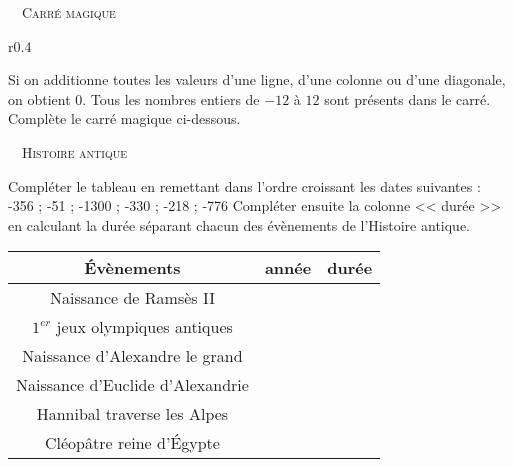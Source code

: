 \documentclass[../Cours.tex]{subfiles}
\begin{document}
\begin{questions}
    \exercice ~~\textsc{Carré magique}\\
    
    \begin{wrapfigure}{r}{0.4\linewidth}
    \vspace{-1cm}
    \end{wrapfigure}
    
    Si on additionne toutes les valeurs d'une ligne, d'une colonne ou d'une diagonale, on obtient 0. Tous les nombres entiers de $-12$ à $12$ sont présents dans le carré.\\
    Complète le carré magique ci-dessous.
    
    \vspace{2cm}
    \exercice ~~\textsc{Histoire antique}
    
    \question Compléter le tableau en remettant dans l'ordre croissant les dates suivantes : \\-356 ; -51 ; -1300 ; -330 ; -218 ; -776
    \question Compléter ensuite la colonne << durée >> en calculant la durée séparant chacun des évènements de l'Histoire antique.
    \begin{center}
    \begin{tabular}{|c|c|c|}\hline
    Évènements & année & durée \\\hline
    Naissance de Ramsès II  & & \\\hline
    $1^{er}$ jeux olympiques antiques  & & \\\hline
    Naissance d'Alexandre le grand & & \\\hline
    Naissance d'Euclide d'Alexandrie & & \\\hline
    Hannibal traverse les Alpes & & \\\hline
    Cléopâtre reine d'Égypte & & \\\hline
    \end{tabular}
    \end{center}
    
\end{questions}
\end{document}
